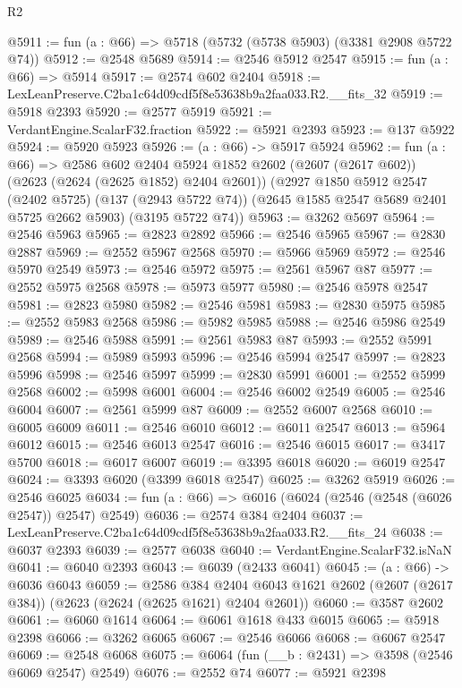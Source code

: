\begin{lexlean}{R2}
\begin{coremodule}
@5911 := fun (a : @66) => @5718 (@5732 (@5738 @5903) (@3381 @2908 @5722 @74))
@5912 := @2548 @5689
@5914 := @2546 @5912 @2547
@5915 := fun (a : @66) => @5914
@5917 := @2574 @602 @2404
@5918 := LexLeanPreserve.C2ba1c64d09cdf5f8e53638b9a2faa033.R2.__fits_32
@5919 := @5918 @2393
@5920 := @2577 @5919
@5921 := VerdantEngine.ScalarF32.fraction
@5922 := @5921 @2393
@5923 := @137 @5922
@5924 := @5920 @5923
@5926 := (a : @66) -> @5917 @5924
@5962 := fun (a : @66) =>
  @2586
    @602
    @2404
    @5924
    @1852
    @2602
    (@2607 (@2617 @602))
    (@2623 (@2624 (@2625 @1852) @2404 @2601))
    (@2927
      @1850
      @5912
      @2547
      (@2402 @5725)
      (@137 (@2943 @5722 @74))
      (@2645 @1585 @2547 @5689 @2401 @5725 @2662 @5903)
      (@3195 @5722 @74))
@5963 := @3262 @5697
@5964 := @2546 @5963
@5965 := @2823 @2892
@5966 := @2546 @5965
@5967 := @2830 @2887
@5969 := @2552 @5967 @2568
@5970 := @5966 @5969
@5972 := @2546 @5970 @2549
@5973 := @2546 @5972
@5975 := @2561 @5967 @87
@5977 := @2552 @5975 @2568
@5978 := @5973 @5977
@5980 := @2546 @5978 @2547
@5981 := @2823 @5980
@5982 := @2546 @5981
@5983 := @2830 @5975
@5985 := @2552 @5983 @2568
@5986 := @5982 @5985
@5988 := @2546 @5986 @2549
@5989 := @2546 @5988
@5991 := @2561 @5983 @87
@5993 := @2552 @5991 @2568
@5994 := @5989 @5993
@5996 := @2546 @5994 @2547
@5997 := @2823 @5996
@5998 := @2546 @5997
@5999 := @2830 @5991
@6001 := @2552 @5999 @2568
@6002 := @5998 @6001
@6004 := @2546 @6002 @2549
@6005 := @2546 @6004
@6007 := @2561 @5999 @87
@6009 := @2552 @6007 @2568
@6010 := @6005 @6009
@6011 := @2546 @6010
@6012 := @6011 @2547
@6013 := @5964 @6012
@6015 := @2546 @6013 @2547
@6016 := @2546 @6015
@6017 := @3417 @5700
@6018 := @6017 @6007
@6019 := @3395 @6018
@6020 := @6019 @2547
@6024 := @3393 @6020 (@3399 @6018 @2547)
@6025 := @3262 @5919
@6026 := @2546 @6025
@6034 := fun (a : @66) => @6016 (@6024 (@2546 (@2548 (@6026 @2547)) @2547) @2549)
@6036 := @2574 @384 @2404
@6037 := LexLeanPreserve.C2ba1c64d09cdf5f8e53638b9a2faa033.R2.__fits_24
@6038 := @6037 @2393
@6039 := @2577 @6038
@6040 := VerdantEngine.ScalarF32.isNaN
@6041 := @6040 @2393
@6043 := @6039 (@2433 @6041)
@6045 := (a : @66) -> @6036 @6043
@6059 := @2586
    @384
    @2404
    @6043
    @1621
    @2602
    (@2607 (@2617 @384))
    (@2623 (@2624 (@2625 @1621) @2404 @2601))
@6060 := @3587 @2602
@6061 := @6060 @1614
@6064 := @6061 @1618 @433 @6015
@6065 := @5918 @2398
@6066 := @3262 @6065
@6067 := @2546 @6066
@6068 := @6067 @2547
@6069 := @2548 @6068
@6075 := @6064 (fun (__b : @2431) => @3598 (@2546 @6069 @2547) @2549)
@6076 := @2552 @74
@6077 := @5921 @2398

\end{coremodule}
\end{lexlean}
